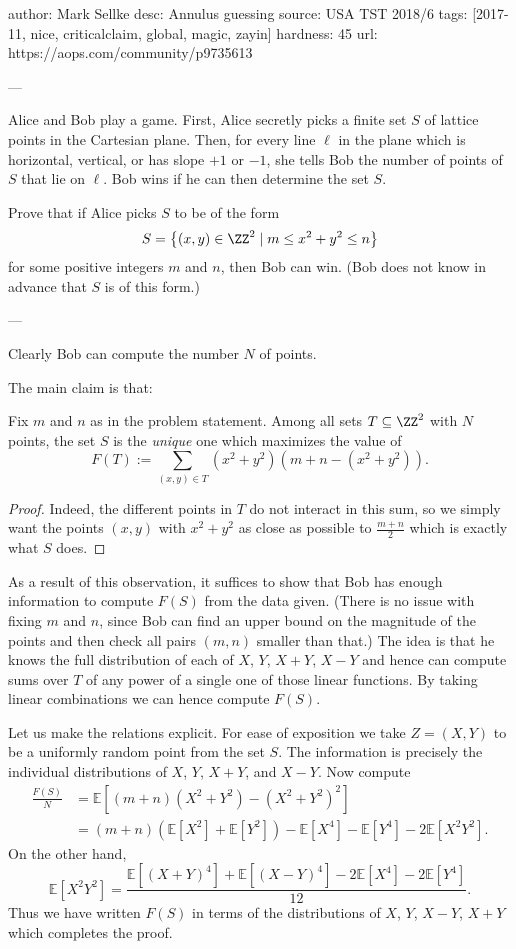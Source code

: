author: Mark Sellke
desc: Annulus guessing
source: USA TST 2018/6
tags: [2017-11, nice, criticalclaim, global, magic, zayin]
hardness: 45
url: https://aops.com/community/p9735613

---

Alice and Bob play a game.
First, Alice secretly picks a finite set $S$
of lattice points in the Cartesian plane.
Then, for every line $\ell$ in the plane
which is horizontal, vertical, or has slope $+1$ or $-1$,
she tells Bob the number of points of $S$ that lie on $\ell$.
Bob wins if he can then determine the set $S$.

Prove that if Alice picks $S$ to be of the form
\[ S = \left\{ (x,y) \in \ZZ^2 \mid m \le x^2+y^2 \le n \right\} \]
for some positive integers $m$ and $n$, then Bob can win.
(Bob does not know in advance that $S$ is of this form.)

---

Clearly Bob can compute the number $N$ of points.

The main claim is that:
\begin{claim*}
  Fix $m$ and $n$ as in the problem statement.
  Among all sets $T \subseteq \ZZ^2$ with $N$ points,
  the set $S$ is the \emph{unique} one which maximizes the value of
  \[ F(T):=\sum_{(x,y)\in T} (x^2+y^2)(m+n-(x^2+y^2)).  \]
\end{claim*}
\begin{proof}
  Indeed, the different points in $T$ do not interact in this sum,
  so we simply want the points $(x,y)$ with $x^2+y^2$
  as close as possible to $\frac{m+n}{2}$ which is exactly what $S$ does.
\end{proof}
As a result of this observation,
it suffices to show that Bob has enough information to
compute $F(S)$ from the data given.
(There is no issue with fixing $m$ and $n$,
since Bob can find an upper bound on the magnitude
of the points and then check all pairs $(m,n)$ smaller than that.)
The idea is that he knows the full distribution of each of
$X$, $Y$, $X+Y$, $X-Y$ and hence can compute sums
over $T$ of any power of a single one of those linear functions.
By taking linear combinations we can hence compute $F(S)$.

Let us make the relations explicit.
For ease of exposition we take $Z=(X,Y)$ to be a
uniformly random point from the set $S$.
The information is precisely the individual distributions
of $X$, $Y$, $X+Y$, and $X-Y$.
Now compute
\begin{align*}
  \frac{F(S)}{N} &= \mathbb E\left[ (m+n)(X^2+Y^2) - (X^2+Y^2)^2 \right] \\
  &= (m+n) \left( \mathbb E[X^2] + \mathbb E[Y^2] \right)
  - \mathbb E[X^4] - \mathbb E[Y^4] - 2 \mathbb E[X^2 Y^2].
\end{align*}
On the other hand,
\[ \mathbb E[X^2Y^2]
  = \frac{\mathbb E[(X+Y)^4] + \mathbb E[(X-Y)^4]
  - 2\mathbb E[X^4] - 2\mathbb E[Y^4]}{12}. \]
Thus we have written $F(S)$ in terms of the distributions
of $X$, $Y$, $X-Y$, $X+Y$ which completes the proof.

